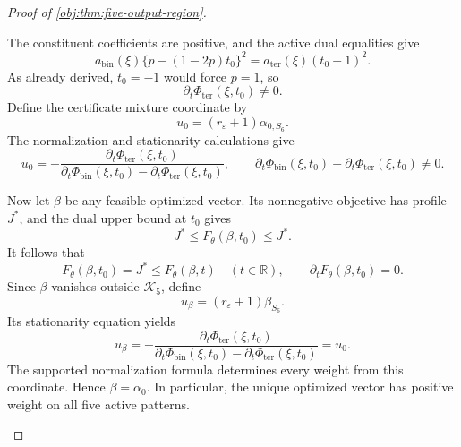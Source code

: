 \documentclass[11pt]{article}
\begin{document}
\begin{proof}[Proof of \cref{obj:thm:five-output-region}]
\begin{enumerate}
The constituent coefficients are positive, and the active dual
equalities give
\[
a_{\mathrm{bin}}(\xi)\{p-(1-2p)t_0\}^2
=
a_{\mathrm{ter}}(\xi)(t_0+1)^2.
\]
As already derived, \(t_0=-1\) would force \(p=1\), so
\[
\partial_t\Phi_{\mathrm{ter}}(\xi,t_0)\ne0.
\]
Define the certificate mixture coordinate by
\[
u_0=(r_\varepsilon+1)\alpha_{0,S_6}.
\]
The normalization and stationarity calculations give
\[
u_0
=
-\frac{\partial_t\Phi_{\mathrm{ter}}(\xi,t_0)}
       {\partial_t\Phi_{\mathrm{bin}}(\xi,t_0)
        -\partial_t\Phi_{\mathrm{ter}}(\xi,t_0)},
\qquad
\partial_t\Phi_{\mathrm{bin}}(\xi,t_0)
-\partial_t\Phi_{\mathrm{ter}}(\xi,t_0)\ne0.
\]

Now let \(\beta\) be any feasible optimized vector. Its nonnegative
objective has profile \(J^*\), and the dual upper bound at \(t_0\) gives
\[
J^*\le F_\theta(\beta,t_0)\le J^*.
\]
It follows that
\[
F_\theta(\beta,t_0)=J^*
\le F_\theta(\beta,t)\quad(t\in\mathbb R),
\qquad
\partial_tF_\theta(\beta,t_0)=0.
\]
Since \(\beta\) vanishes outside \(\mathcal K_5\), define
\[
u_\beta=(r_\varepsilon+1)\beta_{S_6}.
\]
Its stationarity equation yields
\[
u_\beta
=
-\frac{\partial_t\Phi_{\mathrm{ter}}(\xi,t_0)}
       {\partial_t\Phi_{\mathrm{bin}}(\xi,t_0)
        -\partial_t\Phi_{\mathrm{ter}}(\xi,t_0)}
=u_0.
\]
The supported normalization formula determines every weight from this
coordinate. Hence \(\beta=\alpha_0\). In particular, the unique optimized
vector has positive weight on all five active patterns.


\end{enumerate}
\end{proof}
\end{document}
